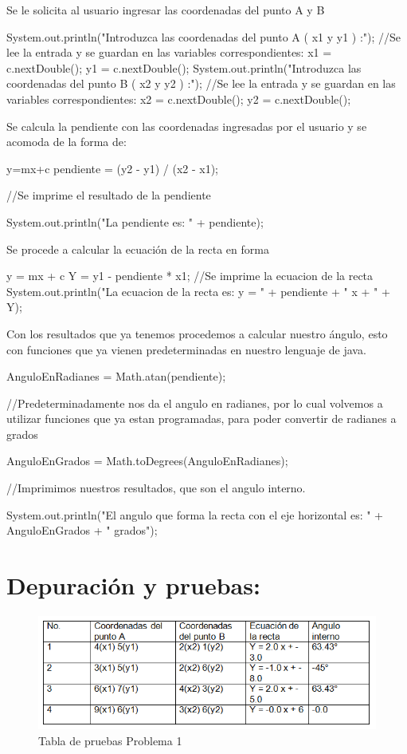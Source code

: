 \documentclass{IEEEcsmag}
\begin{document}
Se le solicita al usuario ingresar las coordenadas del punto A y B
\begin{javaCode}
System.out.println("Introduzca las coordenadas del punto A ( x1 y y1 ) :");
//Se lee la entrada y se guardan en las variables correspondientes:
x1 = c.nextDouble();
y1 = c.nextDouble();
System.out.println("Introduzca las coordenadas del punto B ( x2 y y2 ) :");
//Se lee la entrada y se guardan en las variables correspondientes: 
x2 = c.nextDouble();
y2 = c.nextDouble();
\end{javaCode}
Se calcula la pendiente con las coordenadas ingresadas por el usuario y se acomoda de la forma de: 
\begin{javaCode}
y=mx+c
pendiente = (y2 - y1) / (x2 - x1);

//Se imprime el resultado de la pendiente

System.out.println("La pendiente es: " + pendiente);
\end{javaCode}
Se procede a calcular la ecuación de la recta en forma 
\begin{javaCode}
y = mx + c
Y = y1 - pendiente * x1;
//Se imprime la ecuacion de la recta 
System.out.println("La ecuacion de la recta es: y = " + pendiente + " x + " + Y);
\end{javaCode}
Con los resultados que ya tenemos procedemos a calcular nuestro ángulo, esto con funciones que ya vienen predeterminadas en nuestro lenguaje de java. 
\begin{javaCode}
AnguloEnRadianes = Math.atan(pendiente);

//Predeterminadamente nos da el angulo en radianes, por lo cual volvemos a utilizar funciones que ya estan programadas, para poder convertir de radianes a grados 

AnguloEnGrados = Math.toDegrees(AnguloEnRadianes);

//Imprimimos nuestros resultados, que son el angulo interno. 

System.out.println("El angulo que forma la recta con el eje horizontal es: " +
AnguloEnGrados + " grados");
\end{javaCode}
\section*{Depuración y pruebas:}

\begin{figure}[h!]
    \centering
    \includegraphics[width = 8 cm]{./latex-imagenes/TablaCorridas1.png}
    \caption{Tabla de pruebas Problema 1}
    \label{fig:Diagramadeflujode2 problema2}
\end{figure}
\end{document}
